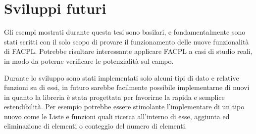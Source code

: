 \section{Sviluppi futuri}
\label{sec:futuro}

Gli esempi mostrati durante questa tesi sono basilari, e fondamentalmente sono stati scritti con il solo scopo di provare il funzionamento delle nuove funzionalità di \ac{FACPL}. Potrebbe risultare interessante applicare \ac{FACPL} a casi di studio reali, in modo da poterne verificare le potenzialità sul campo.\par
Durante lo sviluppo sono stati implementati solo alcuni tipi di dato e relative funzioni su di essi, in futuro sarebbe facilmente possibile implementarne di nuovi in quanto la libreria è stata
progettata per favorirne la rapida e semplice estendibilità. Per esempio potrebbe essere stimolante l'implementare di un tipo nuovo come le Liste e funzioni quali ricerca all'interno di esse, aggiunta ed eliminazione di elementi o conteggio del numero di elementi.
